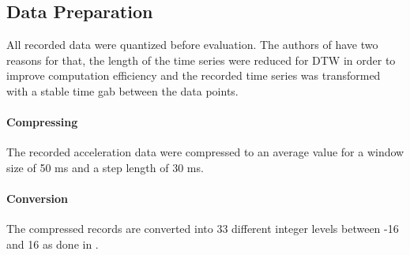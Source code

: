 \subsection{Data Preparation} \label{data_preparation}

All recorded data were quantized before evaluation. The authors of \cite{liu2009uwave} have two reasons for that,
the length of the time series were reduced for DTW in order to improve computation efficiency and the recorded time
series was transformed with a stable time gab between the data points.

\paragraph{Compressing} The recorded acceleration data were compressed to an average value for a window size of 50
ms and a step length of 30 ms.

\paragraph{Conversion} The compressed records are converted into 33 different integer levels between -16 and 16 as done
in \cite{liu2009uwave}.
